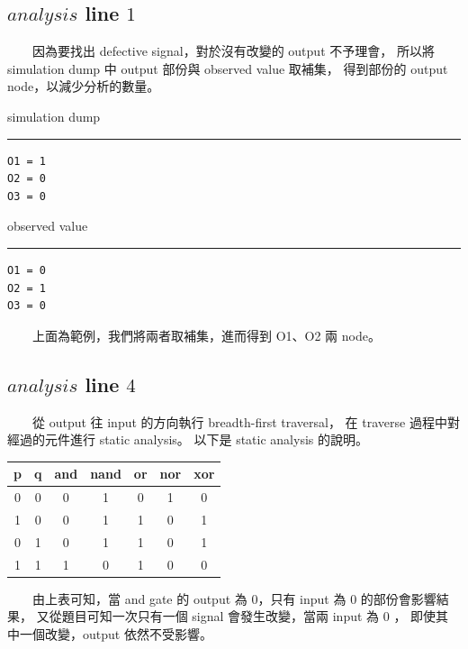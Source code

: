 \documentclass[12pt,a4paper]{article}
\begin{document}
\subsection{$analysis$ line $1$}

　　因為要找出 defective signal，對於沒有改變的 output 不予理會，%
所以將 simulation dump 中 output 部份與 observed value 取補集，%
得到部份的 output node，以減少分析的數量。%

\begin{center}
\begin{minipage}{0.3\textwidth}
\center
simulation dump
\hrule
\begin{verbatim}
O1 = 1
O2 = 0
O3 = 0
\end{verbatim}
\end{minipage}
\begin{minipage}{0.3\textwidth}
\center
observed value
\hrule
\begin{verbatim}
O1 = 0
O2 = 1
O3 = 0
\end{verbatim}
\end{minipage}
\end{center}

　　上面為範例，我們將兩者取補集，進而得到 O1、O2 兩 node。

\subsection{$analysis$ line $4$}

　　從 output 往 input 的方向執行 breadth-first traversal，%
在 traverse 過程中對經過的元件進行 static analysis。%
以下是 static analysis 的說明。

\begin{center}
\begin{tabular}{|c|c|c|c|c|c|c|}
\hline
p & q & and & nand & or & nor & xor\\
\hline
0 & 0 & 0   & 1    & 0  & 1   & 0\\
\hline
1 & 0 & 0   & 1    & 1  & 0   & 1\\
\hline
0 & 1 & 0   & 1    & 1  & 0   & 1\\
\hline
1 & 1 & 1   & 0    & 1  & 0   & 0\\
\hline
\end{tabular}
\end{center}

　　由上表可知，當 and gate 的 output 為 $0$，只有 input 為 $0$ 的部份會影響結果，%
又從題目可知一次只有一個 signal 會發生改變，當兩 input 為 $0$ ，%
即使其中一個改變，output 依然不受影響。
\end{document}
